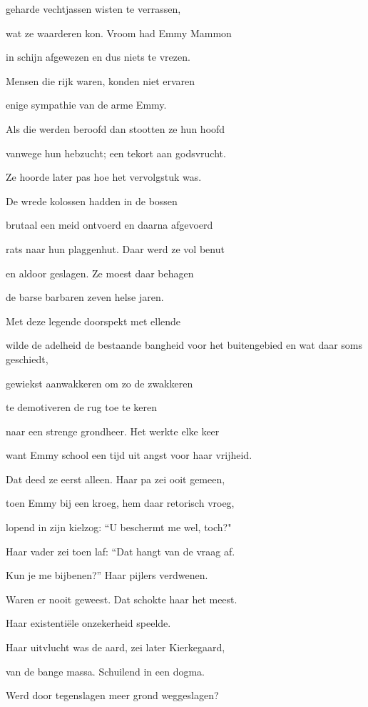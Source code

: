 geharde vechtjassen
wisten te verrassen,

wat ze waarderen kon.
Vroom had Emmy Mammon

in schijn afgewezen
en dus niets te vrezen.

Mensen die rijk waren,
konden niet ervaren

enige sympathie
van de arme Emmy.

Als die werden beroofd
dan stootten ze hun hoofd

vanwege hun hebzucht;
een tekort aan godsvrucht.

Ze hoorde later pas
hoe het vervolgstuk was.

De wrede kolossen
hadden in de bossen

brutaal een meid ontvoerd
en daarna afgevoerd

rats naar hun plaggenhut.
Daar werd ze vol benut

en aldoor geslagen.
Ze moest daar behagen

de barse barbaren
zeven helse jaren.

Met deze legende
doorspekt met ellende

wilde de adelheid
de bestaande bangheid
voor het buitengebied
en wat daar soms geschiedt,

gewiekst aanwakkeren
om zo de zwakkeren

te demotiveren
de rug toe te keren

naar een strenge grondheer.
Het werkte elke keer

want Emmy school een tijd
uit angst voor haar vrijheid.

Dat deed ze eerst alleen.
Haar pa zei ooit gemeen,

toen Emmy bij een kroeg,
hem daar retorisch vroeg,

lopend in zijn kielzog:
“U beschermt me wel, toch?"

Haar vader zei toen laf:
“Dat hangt van de vraag af.

Kun je me bijbenen?”
Haar pijlers verdwenen.

Waren er nooit geweest.
Dat schokte haar het meest.

Haar existentiële
onzekerheid speelde.

Haar uitvlucht was de aard,
zei later Kierkegaard,

van de bange massa.
Schuilend in een dogma.

Werd door tegenslagen
meer grond weggeslagen?
